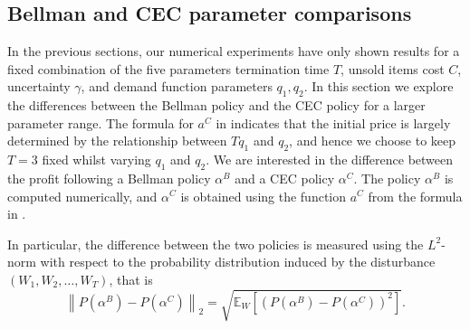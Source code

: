 \documentclass[main.tex]{subfiles}
\begin{document}

\subsection{Bellman and CEC parameter comparisons}\label{sec:parameter_comparison}
In the previous sections, our numerical experiments have only shown
results for a fixed combination of the five parameters
termination time $T$, unsold items cost $C$, uncertainty $\gamma$, and
demand function parameters $q_1,q_2$.
In this section we explore the differences between the Bellman policy
and the CEC policy for a larger parameter range.
The formula for $a^C$ in  indicates that the
initial price is largely determined by the relationship between
$Tq_1$ and $q_2$, and hence we choose to keep $T=3$ fixed whilst
varying $q_1$ and $q_2$.
We are interested in the difference between the profit following
a Bellman policy $\alpha^B$ and a CEC policy $\alpha^C$.
The policy $\alpha^B$ is computed numerically, and
$\alpha^C$ is obtained using the function $a^C$ from
the formula in .

In particular, the difference between the two policies is measured
using the $L^2$-norm with respect to the probability distribution
induced by the disturbance $(W_1,W_2,\dots,W_T)$, that is
\begin{equation}
  \left\|P(\alpha^B)-P(\alpha^C)\right\|_2
  =\sqrt{\mathbb E_W\left[{( P(\alpha^B)-P(\alpha^C) )}^2 \right]}.
\end{equation}
\end{document}
